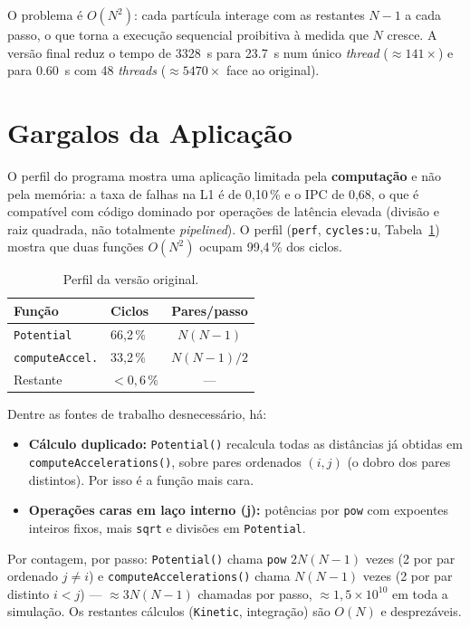 \documentclass[conference]{IEEEtran}
\begin{document}
O problema é $O(N^2)$: cada partícula interage com as restantes $N-1$ a cada passo, o que torna a execução sequencial proibitiva à medida que $N$ cresce. A versão final reduz o tempo de \SI{3328}{s} para \SI{23.7}{s} num único \textit{thread} ($\approx 141\times$) e para \SI{0.60}{s} com 48 \textit{threads} ($\approx 5470\times$ face ao original).

\section{Gargalos da Aplicação}\label{GAR}

O perfil do programa mostra uma aplicação limitada pela \textbf{computação} e não pela memória: a taxa de falhas na L1 é de 0,10\,\% e o IPC de 0,68, o que é compatível com código dominado por operações de latência elevada (divisão e raiz quadrada, não totalmente \textit{pipelined}). O perfil (\texttt{perf}, \texttt{cycles:u}, Tabela~\ref{tab:perfil}) mostra que duas funções $O(N^2)$ ocupam 99,4\,\% dos ciclos.

\begin{table}[t]
\centering\footnotesize
\setlength{\tabcolsep}{4pt}
\caption{Perfil da versão original.}\label{tab:perfil}
\begin{tabular}{@{}llc@{}}
\toprule
\textbf{Função} & \textbf{Ciclos} & \textbf{Pares/passo} \\
\midrule
\texttt{Potential}     & 66,2\,\% & $N(N{-}1)$ \\
\texttt{computeAccel.} & 33,2\,\% & $N(N{-}1)/2$ \\
Restante               & $<0{,}6\,\%$ & --- \\
\bottomrule
\end{tabular}
\end{table}

Dentre as fontes de trabalho desnecessário, há:

\begin{itemize}
  \item \textbf{Cálculo duplicado:} \texttt{Potential()} recalcula todas as distâncias já obtidas em \texttt{computeAccelerations()}, sobre pares ordenados $(i,j)$ (o dobro dos pares distintos). Por isso é a função mais cara.
  \item \textbf{Operações caras em laço interno (j):} potências por \texttt{pow} com expoentes inteiros fixos, mais \texttt{sqrt} e divisões em \texttt{Potential}.
\end{itemize}

\noindent Por contagem, por passo: \texttt{Potential()} chama \texttt{pow} $2N(N{-}1)$ vezes (2 por par ordenado $j\neq i$) e \texttt{computeAccelerations()} chama $N(N{-}1)$ vezes (2 por par distinto $i<j$) --- $\approx3N(N{-}1)$ chamadas por passo, $\approx1{,}5\times10^{10}$ em toda a simulação. Os restantes cálculos (\texttt{Kinetic}, integração) são $O(N)$ e desprezáveis.
\end{document}
